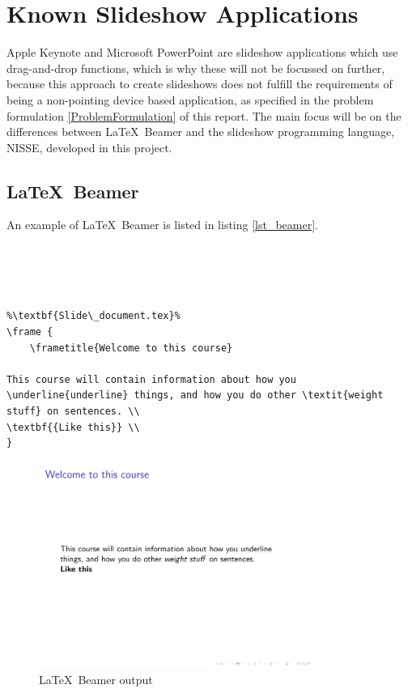 \chapter{Known Slideshow Applications}
Apple Keynote and Microsoft PowerPoint are slideshow applications which use drag-and-drop functions, which is why these will not be focussed on further, because this approach to create slideshows does not fulfill the requirements of being a non-pointing device based application, as specified in the problem formulation \ref{ProblemFormulation} of this report. The main focus will be on the differences between \LaTeX~Beamer and the slideshow programming language, NISSE, developed in this project.

\section{\LaTeX~Beamer}
An example of \LaTeX~Beamer is listed in listing \ref{lst_beamer}.

\begin{lstlisting}[frame=single, caption={Beamer example}, label=lst_beamer]
%\textbf{Main\_document.tex}%




%\textbf{Slide\_document.tex}%
\frame {
	\frametitle{Welcome to this course}

This course will contain information about how you \underline{underline} things, and how you do other \textit{weight stuff} on sentences. \\
\textbf{{Like this}} \\
}
\end{lstlisting}

\begin{figure}[H]
	\centering
		\includegraphics[width=0.8\textwidth]{text/beamer_example.pdf}
	\caption{\LaTeX~Beamer output}
	\label{fig:beamer_example}
\end{figure}


